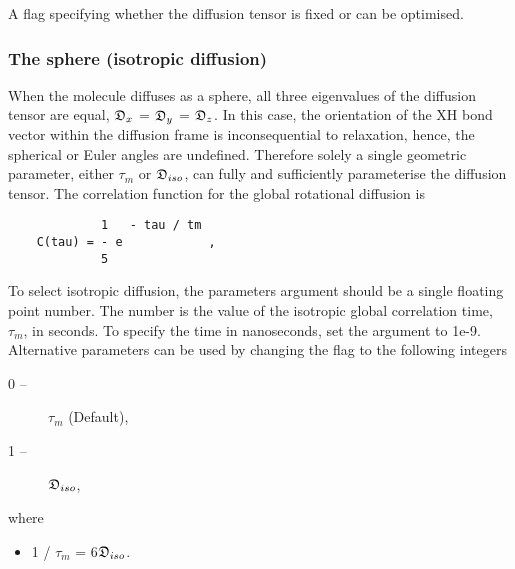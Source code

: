   A flag specifying whether the diffusion tensor is fixed or can be optimised. 




\subsubsection{The sphere (isotropic diffusion)}

When the molecule diffuses as a sphere, all three eigenvalues of the diffusion tensor are equal, $\mathfrak{D}_x$ = $\mathfrak{D}_y$ = $\mathfrak{D}_z$.  In this case, the orientation of the XH bond vector within the diffusion frame is inconsequential to relaxation, hence, the spherical or Euler angles are undefined.  Therefore solely a single geometric parameter, either $\tau_m$ or $\mathfrak{D}_{iso}$, can fully and sufficiently parameterise the diffusion tensor.  The correlation function for the global rotational diffusion is


{\footnotesize \begin{verbatim}
             1   - tau / tm
    C(tau) = - e            ,
             5
\end{verbatim}}

To select isotropic diffusion, the parameters argument should be a single floating point number.  The number is the value of the isotropic global correlation time, $\tau_m$, in seconds. To specify the time in nanoseconds, set the  argument to 1e-9.  Alternative parameters can be used by changing the  flag to the following integers


\begin{description}
\item[0 --]  $\tau_m$   (Default), 
\item[1 --]  $\mathfrak{D}_{iso}$, 
\end{description}


where


\begin{itemize}
\item[] 1 / $\tau_m$ = 6$\mathfrak{D}_{iso}$. 
\end{itemize}




